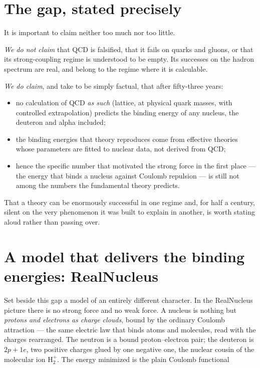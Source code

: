 \documentclass[11pt]{article}
\begin{document}
\section{The gap, stated precisely}
\label{sec:gap}

It is important to claim neither too much nor too little.

\emph{We do not claim} that QCD is falsified, that it fails on quarks and gluons, or that its
strong-coupling regime is understood to be empty. Its successes on the hadron spectrum are real, and
belong to the regime where it is calculable.

\emph{We do claim}, and take to be simply factual, that after fifty-three years:
\begin{itemize}
\item no calculation of QCD \emph{as such} (lattice, at physical quark masses, with controlled
  extrapolation) predicts the binding energy of any nucleus, the deuteron and alpha included;
\item the binding energies that theory reproduces come from effective theories whose parameters are
  fitted to nuclear data, not derived from QCD;
\item hence the specific number that motivated the strong force in the first place --- the energy that
  binds a nucleus against Coulomb repulsion --- is still not among the numbers the fundamental theory
  predicts.
\end{itemize}

That a theory can be enormously successful in one regime and, for half a century, silent on the very
phenomenon it was built to explain in another, is worth stating aloud rather than passing over.

\section{A model that delivers the binding energies: RealNucleus}
\label{sec:realnucleus}

Set beside this gap a model of an entirely different character. In the RealNucleus
picture \cite{realnucleus} there is no strong force and no weak force. A nucleus is nothing but
\emph{protons and electrons as charge clouds}, bound by the ordinary Coulomb attraction --- the same
electric law that binds atoms and molecules, read with the charges rearranged. The neutron is a bound
proton--electron pair; the deuteron is $2p+1e$, two positive charges glued by one negative one, the
nuclear cousin of the molecular ion $\mathrm{H}_2^+$. The energy minimized is the plain Coulomb
functional
\end{document}
